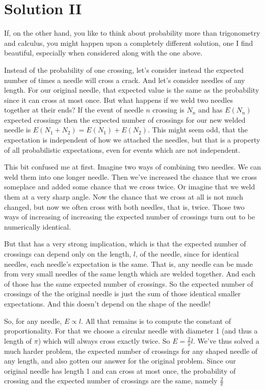 \documentclass[11pt]{tufte-handout}
\begin{document}
\section{Solution II}
If, on the other hand, you like to think about probability more than trigonometry and calculus, you might happen upon a completely different solution, one I find beautiful, especially when considered along with the one above.

Instead of the probability of one crossing, let's consider instead the expected number of times a needle will cross a crack. And let's consider needles of any length. For our original needle, that expected value is the same as the probability since it can cross at most once.  But what happens if we weld two needles together at their ends?  If the event of needle $n$ crossing is $N_n$ and has $E(N_n)$ expected crossings then the expected number of crossings for our new welded needle is $E(N_1 + N_2) = E(N_1) + E(N_2)$.  This might seem odd, that the expectation is independent of how we attached the needles, but that is a property of all probabilistic expectations, even for events which are not independent. 

This bit confused me at first.  Imagine two ways of combining two needles.  We can weld them into one longer needle.  Then we've increased the chance that we cross someplace and added some chance that we cross twice.  Or imagine that we weld them at a very sharp angle.  Now the chance that we cross at all is not much changed, but now we often cross with both needles, that is, twice.  Those two ways of increasing of increasing the expected number of crossings turn out to be numerically identical.

But that has a very strong implication, which is that the expected number of crossings can depend only on the length, $l$, of the needle, since for identical needles, each needle's expectation is the same.  That is, any needle can be made from very small needles of the same length which are welded together.  And each of those has the same expected number of crossings.  So the expected number of crossings of the the original needle is just the sum of those identical smaller expectations.  And this doesn't depend on the shape of the needle!

So, for any needle, $E \propto l$. All that remains is to compute the constant of proportionality.  For that we choose a circular needle with diameter 1 (and thus a length of $\pi$) which will always cross exactly twice. So $E = \frac{2}{\pi}l$.  We've thus solved a much harder problem, the expected number of crossings for any shaped needle of any length, and also gotten our answer for the original problem.  Since our original needle has length 1 and can cross at most once, the probability of crossing and the expected number of crossings are the same, namely $\frac{2}{\pi}$  
\end{document}
